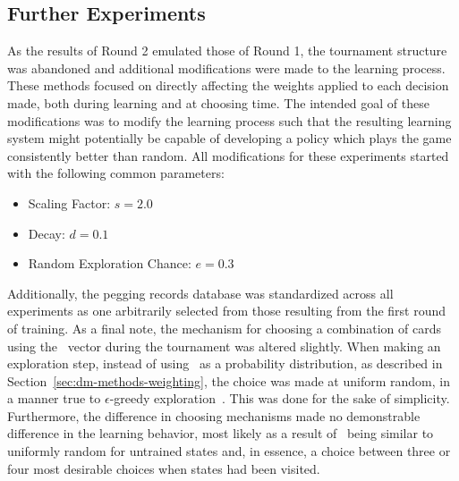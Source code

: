 

\subsection{Further Experiments}
\label{sec:findings-expts}

As the results of Round 2 emulated those of Round 1,
the tournament structure was abandoned and
additional modifications were made to the learning process.
%
These methods focused on directly affecting the weights applied to each
decision made,
both during learning and at choosing time.
%
The intended goal of these modifications was to modify the learning process
such that the resulting learning system might potentially be
capable of developing a policy which plays the game consistently better than
random.
%
All modifications for these experiments started with the following common
parameters:
\begin{itemize}
	\item Scaling Factor: $s = 2.0$
	\item Decay: $d = 0.1$
	\item Random Exploration Chance: $e = 0.3$
\end{itemize}
%
Additionally,
the pegging records database was standardized across all experiments
as one arbitrarily selected from those resulting from the first round of training.
%
As a final note,
the mechanism for choosing a combination of cards using the \pvec\ vector 
during the tournament was altered slightly.
%
When making an exploration step,
instead of using \pvec\ as a probability distribution,
as described in Section~\ref{sec:dm-methods-weighting},
the choice was made at uniform random,
in a manner true to $\epsilon$-greedy exploration~\cite{rl_book}.
%
This was done for the sake of simplicity.
%
Furthermore,
the difference in choosing mechanisms
made no demonstrable difference in the learning behavior,
most likely as a result of \pvec\ being similar to uniformly random
for untrained states
and, in essence, a choice between three or four most desirable choices when
states had been visited.

%












